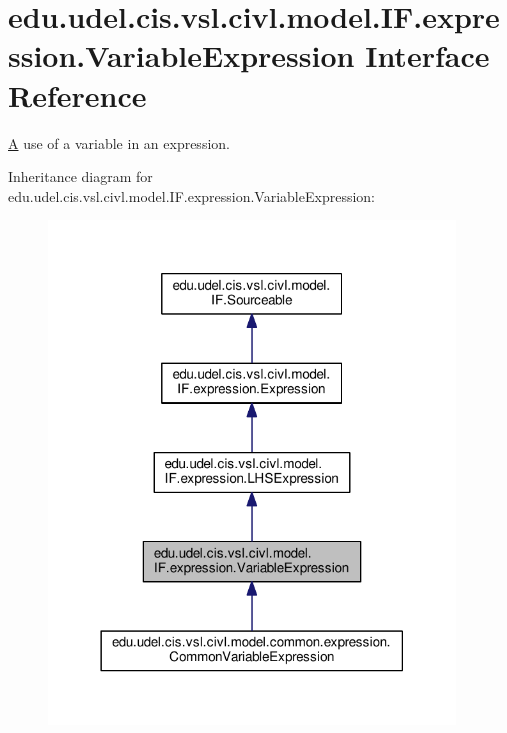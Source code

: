 \hypertarget{interfaceedu_1_1udel_1_1cis_1_1vsl_1_1civl_1_1model_1_1IF_1_1expression_1_1VariableExpression}{}\section{edu.\+udel.\+cis.\+vsl.\+civl.\+model.\+I\+F.\+expression.\+Variable\+Expression Interface Reference}
\label{interfaceedu_1_1udel_1_1cis_1_1vsl_1_1civl_1_1model_1_1IF_1_1expression_1_1VariableExpression}


\hyperlink{structA}{A} use of a variable in an expression.  




Inheritance diagram for edu.\+udel.\+cis.\+vsl.\+civl.\+model.\+I\+F.\+expression.\+Variable\+Expression\+:
\nopagebreak
\begin{figure}[H]
\begin{center}
\leavevmode
\includegraphics[width=306pt]{interfaceedu_1_1udel_1_1cis_1_1vsl_1_1civl_1_1model_1_1IF_1_1expression_1_1VariableExpression__inherit__graph}
\end{center}
\end{figure}


